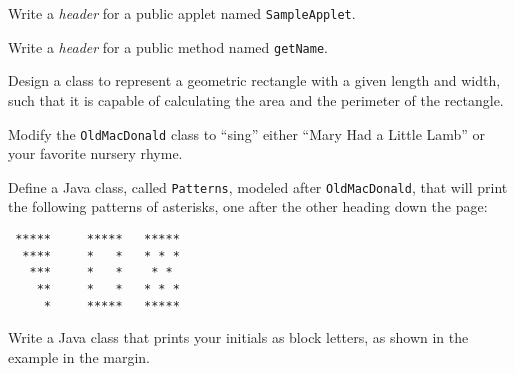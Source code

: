 \begin{EXRtwo}
\item  Write a {\it header} for a public applet named {\tt SampleApplet}.

\item  Write a {\it header} for a public method named {\tt getName}.

\item  Design a class to represent a geometric rectangle with a given
length and width, such that it is capable of calculating the area and
the perimeter of the rectangle.  

\item  Modify the {\tt OldMacDonald} class to ``sing'' either
``Mary Had a Little Lamb'' or your favorite nursery rhyme.

\item  Define a Java class, called {\tt Patterns},
modeled after {\tt Old\-Mac\-Donald}, that will print the following
patterns of asterisks, one after the other heading down the page:
\begin{jjjlisting}
\begin{lstlisting}
 *****     *****   *****
  ****     *   *   * * *
   ***     *   *    * *
    **     *   *   * * *
     *     *****   *****
\end{lstlisting}
\end{jjjlisting}

\item  Write a Java class that prints your initials as block
letters, as shown in the example in the margin.

\marginnote{\small\tt
\mbox{*}*****\mbox{ }*\mbox{ }\mbox{ }\mbox{ }\mbox{ }\mbox{ }\mbox{ }\mbox{ }*\\
\mbox{*}\mbox{ }\mbox{ }\mbox{ }\mbox{ }*\mbox{ }**\mbox{ }\mbox{ }\mbox{ }\mbox{ }\mbox{ }**\\
\mbox{*}\mbox{ }\mbox{ }\mbox{ }\mbox{ }*\mbox{ }*\mbox{ }*\mbox{ }\mbox{ }\mbox{ }*\mbox{ }*\\
\mbox{*}*****\mbox{ }*\mbox{ }\mbox{ }*\mbox{ }*\mbox{ }\mbox{ }*\\
\mbox{**}\mbox{ }\mbox{ }\mbox{ }\mbox{ }\mbox{ }*\mbox{ }\mbox{ }\mbox{ }*\mbox{ }\mbox{ }\mbox{ }*\\
\mbox{*}\mbox{ }*\mbox{ }\mbox{ }\mbox{ }\mbox{ }*\mbox{ }\mbox{ }\mbox{ }\mbox{ }\mbox{ }\mbox{ }\mbox{ }*\\
\mbox{*}\mbox{ }\mbox{ }*\mbox{ }\mbox{ }\mbox{ }*\mbox{ }\mbox{ }\mbox{ }\mbox{ }\mbox{ }\mbox{ }\mbox{ }*\\
\mbox{*}\mbox{ }\mbox{ }\mbox{ }*\mbox{ }\mbox{ }*\mbox{ }\mbox{ }\mbox{ }\mbox{ }\mbox{ }\mbox{ }\mbox{ }*
}


\end{EXRtwo}
